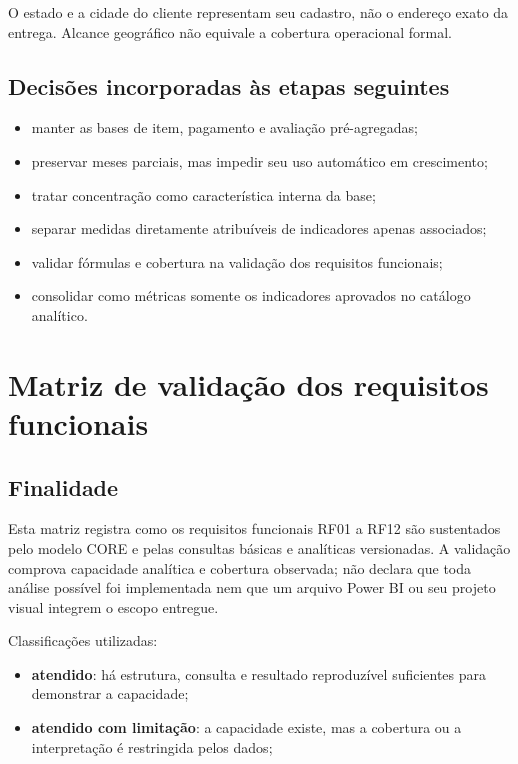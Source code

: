 \documentclass[12pt,a4paper]{article}
\providecommand{\tightlist}{
  \setlength{\itemsep}{0pt}\setlength{\parskip}{0pt}
}
\begin{document}
O estado e a cidade do cliente representam seu cadastro, não o endereço
exato da entrega. Alcance geográfico não equivale a cobertura
operacional formal.

\subsection{Decisões incorporadas às etapas
seguintes}\label{docs__analytics__evidencias_consultas_analiticas_core.md__decisuxf5es-para-as-pruxf3ximas-etapas}

\begin{itemize}
\tightlist
\item
  manter as bases de item, pagamento e avaliação pré-agregadas;
\item
  preservar meses parciais, mas impedir seu uso automático em
  crescimento;
\item
  tratar concentração como característica interna da base;
\item
  separar medidas diretamente atribuíveis de indicadores apenas
  associados;
\item
  validar fórmulas e cobertura na validação dos requisitos funcionais;
\item
  consolidar como métricas somente os indicadores aprovados no catálogo analítico.
\end{itemize}

\section{Matriz de validação dos requisitos
funcionais}\label{docs__analytics__matriz_validacao_requisitos_funcionais.md__matriz-de-validauxe7uxe3o-dos-requisitos-funcionais}

\subsection{Finalidade}\label{docs__analytics__matriz_validacao_requisitos_funcionais.md__finalidade}

Esta matriz registra como os requisitos funcionais RF01 a RF12 são
sustentados pelo modelo CORE e pelas consultas básicas e analíticas versionadas. A validação comprova capacidade analítica e cobertura
observada; não declara que toda análise possível foi implementada nem que
um arquivo Power BI ou seu projeto visual integrem o escopo entregue.

Classificações utilizadas:

\begin{itemize}
\tightlist
\item
  \textbf{atendido}: há estrutura, consulta e resultado reproduzível
  suficientes para demonstrar a capacidade;
\item
  \textbf{atendido com limitação}: a capacidade existe, mas a cobertura
  ou a interpretação é restringida pelos dados;
\end{itemize}
\end{document}
